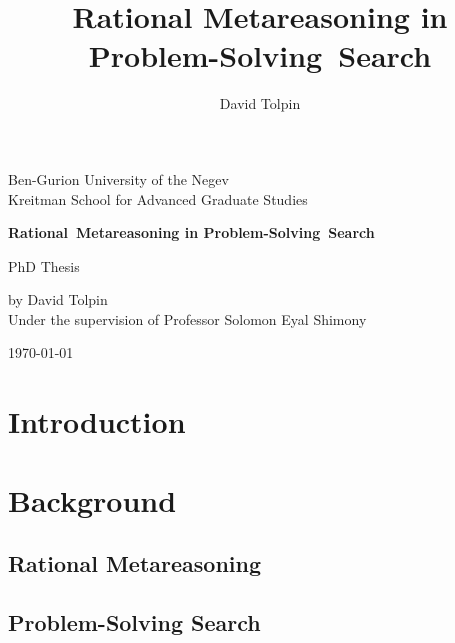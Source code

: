 \documentclass[oneside,a4paper]{report}
\title {Rational Metareasoning in Problem-Solving~Search}
\author {David Tolpin}
\begin{document}
\begin{titlepage}
\begin{center}
{\large Ben-Gurion University of the Negev
\\
Kreitman School for Advanced Graduate Studies}
\vspace{1in}

{\bf\LARGE Rational~Metareasoning in Problem-Solving~Search}
\vspace{1in}

{\large PhD Thesis
\\
\vspace{1in}

by David Tolpin
\\
Under the supervision of Professor Solomon Eyal Shimony
\\
\vfill

\today}

\vspace{1in}

\end{center}
\end{titlepage}


\setcounter{page}{1}



\setcounter{tocdepth}{5}
\tableofcontents

\newpage
\setcounter{page}{1}

\chapter{Introduction}
\label{ch:intro}


\chapter{Background}
\label{ch:bg}

\section{Rational Metareasoning}
\label{sec:ratimeta}


\section{Problem-Solving Search}
\label{sec:search}

\end{document}

